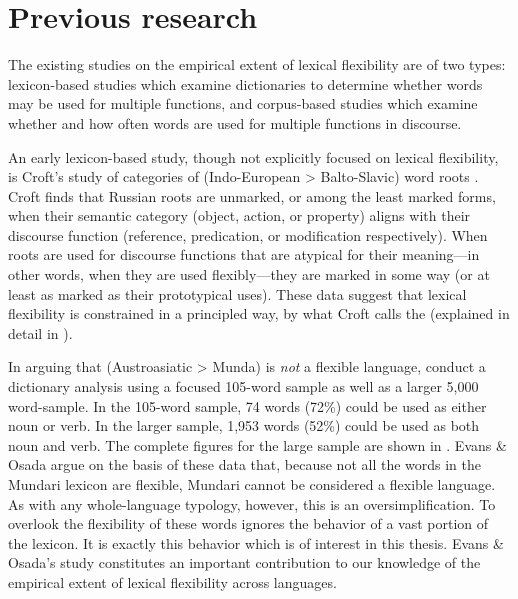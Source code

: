 \section{Previous research}
\label{sec:1.2}

The existing studies on the empirical extent of lexical flexibility are of two types: lexicon-based studies which examine dictionaries to determine whether words may be used for multiple functions, and corpus-based studies which examine whether and how often words are used for multiple functions in discourse.

An early lexicon-based study, though not explicitly focused on lexical flexibility, is Croft's \parencite*{Croft1984} study of categories of  (Indo-European > Balto-Slavic) word roots . Croft finds that Russian roots are unmarked, or among the least marked forms, when their semantic category (object, action, or property) aligns with their discourse function (reference, predication, or modification respectively). When roots are used for discourse functions that are atypical for their meaning—in other words, when they are used flexibly—they are marked in some way (or at least as marked as their prototypical uses). These data suggest that lexical flexibility is constrained in a principled way, by what Croft calls the  (explained in detail in ).

In arguing that  (Austroasiatic > Munda) is \emph{not} a flexible language, \textcite{EvansOsada2005} conduct a dictionary analysis using a focused 105-word sample as well as a larger 5,000 word-sample. In the 105-word sample, 74 words (72\%) could be used as either noun or verb. In the larger sample, 1,953 words (52\%) could be used as both noun and verb. The complete figures for the large sample are shown in . Evans \& Osada argue on the basis of these data that, because not all the words in the Mundari lexicon are flexible, Mundari cannot be considered a flexible language. As with any whole-language typology, however, this is an oversimplification. To overlook the flexibility of these words ignores the behavior of a vast portion of the lexicon. It is exactly this behavior which is of interest in this thesis. Evans \& Osada's study constitutes an important contribution to our knowledge of the empirical extent of lexical flexibility across languages.

